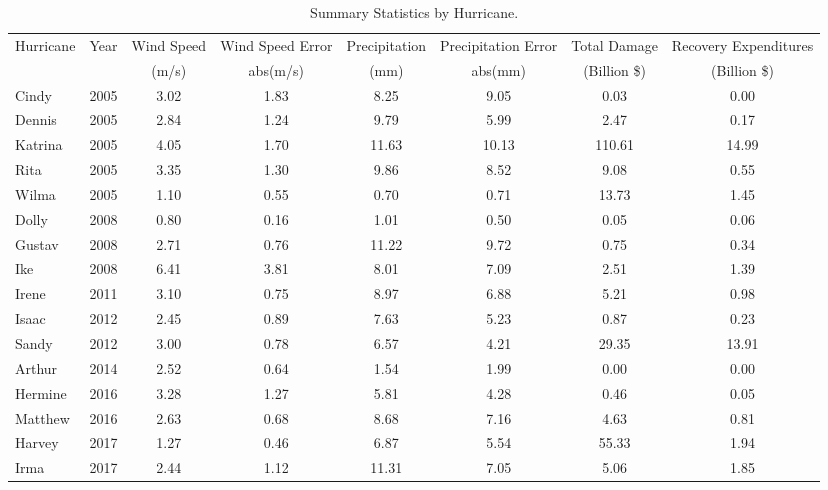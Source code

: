 \begin{table}

\caption{\label{tab:summary_dmg}Summary Statistics by Hurricane.}
\centering
\begin{adjustbox}{max width = \textwidth}
\begin{threeparttable}
\begin{tabular}[t]{lccccccc}
\toprule
\multicolumn{1}{c}{Hurricane} & \multicolumn{1}{c}{Year} & \multicolumn{1}{c}{Wind Speed} & \multicolumn{1}{c}{Wind Speed Error} & \multicolumn{1}{c}{Precipitation} & \multicolumn{1}{c}{Precipitation Error} & \multicolumn{1}{c}{Total Damage} & \multicolumn{1}{c}{Recovery Expenditures} \\
\cmidrule(l{3pt}r{3pt}){1-1} \cmidrule(l{3pt}r{3pt}){2-2} \cmidrule(l{3pt}r{3pt}){3-3} \cmidrule(l{3pt}r{3pt}){4-4} \cmidrule(l{3pt}r{3pt}){5-5} \cmidrule(l{3pt}r{3pt}){6-6} \cmidrule(l{3pt}r{3pt}){7-7} \cmidrule(l{3pt}r{3pt}){8-8}
 &  & (m/s) & abs(m/s) & (mm) & abs(mm) & (Billion \$) & (Billion \$)\\
\midrule
Cindy & 2005 & 3.02 & 1.83 & 8.25 & 9.05 & 0.03 & 0.00\\
Dennis & 2005 & 2.84 & 1.24 & 9.79 & 5.99 & 2.47 & 0.17\\
Katrina & 2005 & 4.05 & 1.70 & 11.63 & 10.13 & 110.61 & 14.99\\
Rita & 2005 & 3.35 & 1.30 & 9.86 & 8.52 & 9.08 & 0.55\\
Wilma & 2005 & 1.10 & 0.55 & 0.70 & 0.71 & 13.73 & 1.45\\
Dolly & 2008 & 0.80 & 0.16 & 1.01 & 0.50 & 0.05 & 0.06\\
Gustav & 2008 & 2.71 & 0.76 & 11.22 & 9.72 & 0.75 & 0.34\\
Ike & 2008 & 6.41 & 3.81 & 8.01 & 7.09 & 2.51 & 1.39\\
Irene & 2011 & 3.10 & 0.75 & 8.97 & 6.88 & 5.21 & 0.98\\
Isaac & 2012 & 2.45 & 0.89 & 7.63 & 5.23 & 0.87 & 0.23\\
Sandy & 2012 & 3.00 & 0.78 & 6.57 & 4.21 & 29.35 & 13.91\\
Arthur & 2014 & 2.52 & 0.64 & 1.54 & 1.99 & 0.00 & 0.00\\
Hermine & 2016 & 3.28 & 1.27 & 5.81 & 4.28 & 0.46 & 0.05\\
Matthew & 2016 & 2.63 & 0.68 & 8.68 & 7.16 & 4.63 & 0.81\\
Harvey & 2017 & 1.27 & 0.46 & 6.87 & 5.54 & 55.33 & 1.94\\
Irma & 2017 & 2.44 & 1.12 & 11.31 & 7.05 & 5.06 & 1.85\\

\end{tabular}
\end{threeparttable}
\end{adjustbox}
\end{table}
